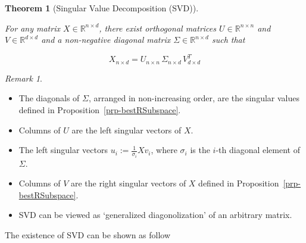 \documentclass[
  letterpaper,
  DIV=11,
  numbers=noendperiod]{scrreprt}
\providecommand{\tightlist}{%
  \setlength{\itemsep}{0pt}\setlength{\parskip}{0pt}}
\theoremstyle{definition}
\theoremstyle{plain}
\newtheorem{theorem}{Theorem}[chapter]
\theoremstyle{plain}
\theoremstyle{definition}
\theoremstyle{plain}
\theoremstyle{plain}
\theoremstyle{remark}
\newtheorem{refremark}{Remark}[chapter]
\begin{document}
\begin{theorem}[Singular Value Decomposition
(SVD)]\protect\hypertarget{thm-SVD}{}\label{thm-SVD}

For any matrix \(X \in \mathbb{R}^{n \times d}\), there exist orthogonal
matrices \(U \in \mathbb{R}^{n \times n}\) and
\(V \in \mathbb{R}^{d \times d}\) and a non-negative diagonal matrix
\(\Sigma \in \mathbb{R}^{n \times d}\) such that

\[
X_{n \times d} = U_{n \times n}\, \Sigma_{n \times d}\, V_{d \times d}^T
\]

\end{theorem}

\begin{refremark}
\leavevmode

\begin{itemize}
\tightlist
\item
  The diagonals of \(\Sigma\), arranged in non-increasing order, are the
  singular values defined in Proposition~\ref{prp-bestRSubspace}.
\item
  Columns of \(U\) are the left singular vectors of \(X\).
\item
  The left singular vectors \(u_i := \frac{1}{\sigma_i} X v_i\), where
  \(\sigma_i\) is the \(i\)-th diagonal element of \(\Sigma\).
\item
  Columns of \(V\) are the right singular vectors of \(X\) defined in
  Proposition~\ref{prp-bestRSubspace}.
\item
  SVD can be viewed as `generalized diagonolization' of an arbitrary
  matrix.
\end{itemize}

\label{rem-SVD}

\end{refremark}

The existence of SVD can be shown as follow
\end{document}
